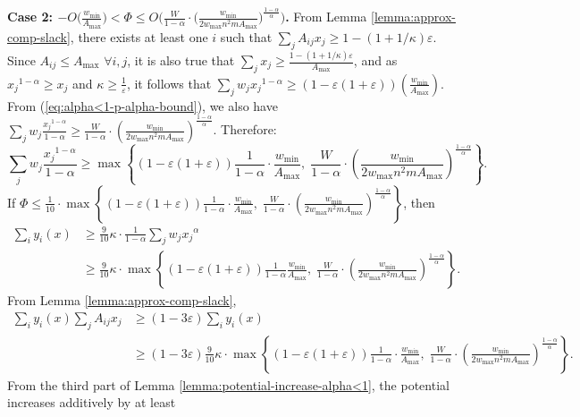 \documentclass[11pt]{article}
\makeatletter
\newenvironment{proofof}[1]{\par
  \pushQED{\qed}\normalfont \topsep3\p@\relax
  \trivlist
  \item[\hskip\labelsep
        \bfseries
    Proof of #1\@addpunct{.}]\ignorespaces
}{\popQED\endtrivlist\@endpefalse
}
\makeatother
\begin{document}
\begin{proofof}{Theorem \ref{thm:convergence-alpha<1}}
\noindent\textbf{Case 2: $-O\big(\frac{ w_{\min}}{A_{\max}}\big) < \Phi \leq O\Big(\frac{W}{1-\alpha}\cdot\big(\frac{w_{\min}}{2w_{\max}n^2mA_{\max}}\big)^{\frac{1-\alpha}{\alpha}}\Big)$.} From Lemma \ref{lemma:approx-comp-slack}, there exists at least one $i$ such that $\sum_j A_{ij}x_j \geq 1-(1+1/\kappa)\varepsilon$. Since $A_{ij}\leq A_{\max}$ $\forall i, j$, it is also true that $\sum_{j}x_j \geq \frac{1-(1+1/\kappa)\varepsilon}{A_{\max}}$, and as ${x_j}^{1-\alpha}\geq x_j$ and $\kappa \geq \frac{1}{\varepsilon}$, it follows that $\sum_{j}w_j{x_j}^{1-\alpha}\geq (1-\varepsilon(1+\varepsilon))\left(\frac{ w_{\min}}{A_{\max}}\right)$. From (\ref{eq:alpha<1-p-alpha-bound}), we also have $\sum_j w_j \frac{{x_j}^{1-\alpha}}{1-\alpha}\geq \frac{W}{1-\alpha}\cdot\left(\frac{w_{\min}}{2w_{\max}n^2mA_{\max}}\right)^{\frac{1-\alpha}{\alpha}}$. Therefore:
\begin{equation}
\sum_j w_j \frac{{x_j}^{1-\alpha}}{1-\alpha} \geq \max\left\{(1-\varepsilon(1+\varepsilon))\frac{1}{1-\alpha}\cdot \frac{ w_{\min}}{A_{\max}},\; \frac{W}{1-\alpha}\cdot\left(\frac{w_{\min}}{2w_{\max}n^2mA_{\max}}\right)^{\frac{1-\alpha}{\alpha}}\right\}. \label{eq:alpha<1-p-alpha-case2-bound}
\end{equation}
If $\Phi \leq \frac{1}{10}\cdot\max\left\{(1-\varepsilon(1+\varepsilon))\frac{1}{1-\alpha}\cdot \frac{ w_{\min}}{A_{\max}},\; \frac{W}{1-\alpha}\cdot\left(\frac{w_{\min}}{2w_{\max}n^2mA_{\max}}\right)^{\frac{1-\alpha}{\alpha}}\right\}$, then 
\begin{align*}
\sum_i y_i(x)  &\geq  \frac{9}{10}\kappa\cdot\frac{1}{1-\alpha}\sum_{j}w_j{x_j}^{\alpha}\\
&\geq \frac{9}{10}\kappa\cdot \max\left\{(1-\varepsilon(1+\varepsilon))\frac{1}{1-\alpha}\frac{ w_{\min}}{A_{\max}},\; \frac{W}{1-\alpha}\cdot\left(\frac{w_{\min}}{2w_{\max}n^2mA_{\max}}\right)^{\frac{1-\alpha}{\alpha}}\right\}.
\end{align*}
From Lemma \ref{lemma:approx-comp-slack}, 
\begin{align*}
\sum_i y_i(x) \sum_j A_{ij}x_j&\geq (1-3\varepsilon)\sum_i y_i(x) \\
&\geq (1-3\varepsilon)\frac{9}{10}\kappa\cdot \max\left\{(1-\varepsilon(1+\varepsilon))\frac{1}{1-\alpha}\cdot \frac{ w_{\min}}{A_{\max}},\; \frac{W}{1-\alpha}\cdot\left(\frac{w_{\min}}{2w_{\max}n^2mA_{\max}}\right)^{\frac{1-\alpha}{\alpha}}\right\}.
\end{align*}
From the third part of Lemma \ref{lemma:potential-increase-alpha<1}, the potential increases additively by at least 

\end{proofof}
\end{document}
